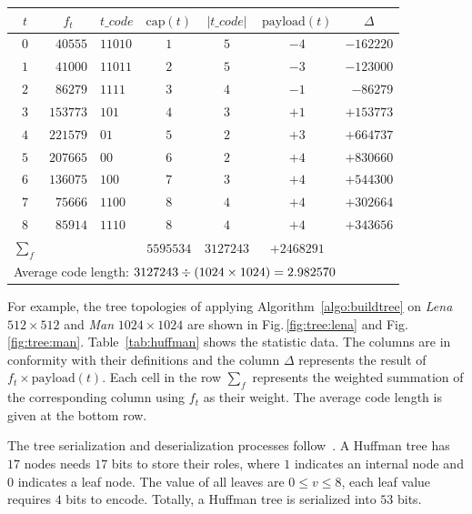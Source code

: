 \documentclass{elsarticle}
\begin{document}
\begin{table}[!t]
		
		\begin{tabular}{c@{\;}rl@{}c@{\;}c@{\;}c@{}r}
			\toprule 
			\(t\) &   
			\multicolumn{1}{c}{\(f_t\)} &     
			\multicolumn{1}{c}{\(t\_code\)}  &  
			\(\mathrm{cap}(t)\) &    
			\(\vert t\_code \vert\)    & 
			\(\mathrm{payload}(t)\)  & 
			\multicolumn{1}{c}{\(\Delta\)}  \\
			\midrule 
			$0$ & $40555$   & $11010$ & $1$ & $5$ & $-4$ & $-162220$  \\ 
			$1$ & $41000$   & $11011$ & $2$ & $5$ & $-3$ & $-123000$  \\ 
			$2$ & $86279$   & $1111$  & $3$ & $4$ & $-1$ & $-86279$   \\ 
			$3$ & $153773$  & $101$   & $4$ & $3$ & $+1$ & $+153773$  \\ 
			$4$ & $221579$  & $01$    & $5$ & $2$ & $+3$ & $+664737$  \\ 
			$5$ & $207665$  & $00$    & $6$ & $2$ & $+4$ & $+830660$  \\ 
			$6$ & $136075$  & $100$   & $7$ & $3$ & $+4$ & $+544300$  \\ 
			$7$ & $75666$   & $1100$  & $8$ & $4$ & $+4$ & $+302664$  \\ 
			$8$ & $85914$   & $1110$  & $8$ & $4$ & $+4$ & $+343656$  \\ 
			\midrule 
			$\sum_f$ &    && $5595534$ & $3127243$ &    $+2468291$ & \\ 
			\midrule
			\multicolumn{7}{l}{Average code length: \(3127243 \divisionsymbol (1024 \times 1024) = 2.982570\)} \\
			\bottomrule
		\end{tabular}
		\label{tab:huffman:man}
	\end{table}
	
	For example, the tree topologies of applying Algorithm~\ref{algo:buildtree} on \emph{Lena} \(512 \times 512\) and \emph{Man} \(1024 \times 1024\) are shown in Fig.\,\ref{fig:tree:lena} and Fig.\,\ref{fig:tree:man}. Table~\ref{tab:huffman} shows the statistic data. 
	The columns are in conformity with their definitions and the column \emph{\(\Delta\)} represents the result of \(f_t \times \mathrm{payload}(t)\). 
	Each cell in the row \emph{\(\sum_f\)} represents the weighted summation of the corresponding column using \(f_t\) as their weight.
	The average code length is given at the bottom row.
	
	The tree serialization and deserialization processes follow~\cite{Pu2006}.
	A Huffman tree has \(17\) nodes needs \(17\) bits to store their roles, where \(1\) indicates an internal node and \(0\) indicates a leaf node. 
	The value of all leaves are \(0 \leq v \leq 8\), each leaf value requires \(4\) bits to encode. 
	Totally, a Huffman tree is serialized into \(53\) bits.
	
\end{document}
